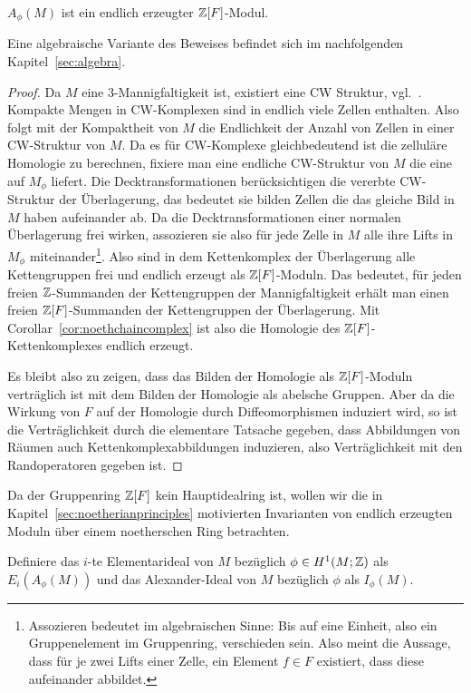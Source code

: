 \begin{prop}
\label{prop:alexendlerz}
		$A_\phi(M)$ ist ein endlich erzeugter $\mathbb{Z}[F]$-Modul.
\end{prop}
\begin{bem}\label{rem:AlexModulendlerz}
	Eine algebraische Variante des Beweises befindet sich im nachfolgenden Kapitel~\ref{sec:algebra}. 
\end{bem}

\begin{proof}
	Da $M$ eine 3-Mannigfaltigkeit ist, existiert eine CW Struktur, vgl.~\cite{Moise.1952}. Kompakte Mengen in CW-Komplexen sind in endlich viele Zellen enthalten. Also folgt mit der Kompaktheit von $M$ die Endlichkeit der Anzahl von Zellen in einer CW-Struktur von $M$. Da es für CW-Komplexe gleichbedeutend ist die zelluläre Homologie zu berechnen, fixiere man eine endliche CW-Struktur von $M$ die eine auf $M_\phi$ liefert. Die Decktransformationen berücksichtigen die vererbte CW-Struktur der Überlagerung, das bedeutet sie bilden Zellen die das gleiche Bild in $M$ haben aufeinander ab. Da die Decktransformationen einer normalen Überlagerung frei wirken, assozieren sie also für jede Zelle in $M$ alle ihre Lifts in $M_\phi$ miteinander\footnote{Assozieren bedeutet im algebraischen Sinne: Bis auf eine Einheit, also ein Gruppenelement im Gruppenring, verschieden sein. Also meint die Aussage, dass für je zwei Lifts einer Zelle, ein Element $f\in F$ existiert, dass diese aufeinander abbildet.}. Also sind in dem Kettenkomplex der Überlagerung alle Kettengruppen frei und endlich erzeugt als $\mathbb{Z}[F]$-Moduln. Das bedeutet, für jeden freien $\mathbb{Z}$-Summanden der Kettengruppen der Mannigfaltigkeit erhält man einen freien $\mathbb{Z}[F]$-Summanden der Kettengruppen der Überlagerung. Mit Corollar~\ref{cor:noethchaincomplex} ist also die Homologie des $\mathbb{Z}[F]$-Kettenkomplexes endlich erzeugt. 

	Es bleibt also zu zeigen, dass das Bilden der Homologie als $\mathbb{Z}[F]$-Moduln verträglich ist mit dem Bilden der Homologie als abelsche Gruppen. Aber da die Wirkung von $F$ auf der Homologie durch Diffeomorphismen induziert wird, so ist die Verträglichkeit durch die elementare Tatsache gegeben, dass Abbildungen von Räumen auch Kettenkomplexabbildungen induzieren, also Verträglichkeit mit den Randoperatoren gegeben ist.
\end{proof}

%

     	Da der Gruppenring $\mathbb{Z}[F]$ kein Hauptidealring ist, wollen wir die in Kapitel~\ref{sec:noetherianprinciples} motivierten Invarianten von endlich erzeugten Moduln über einem noetherschen Ring betrachten.
     	\begin{defn}
     		Definiere das $i$-te Elementarideal von $M$ bezüglich $\phi\in H^1(M;\mathbb{Z})$ als $E_i(A_\phi(M))$ und das Alexander-Ideal von $M$ bezüglich $\phi$ als $I_\phi(M)$.
     	\end{defn}


